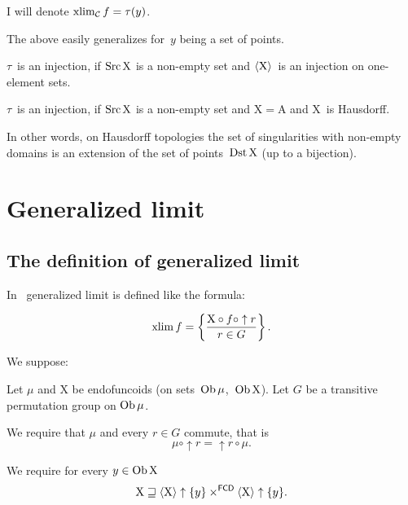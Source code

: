 I will denote $\operatorname{xlim}_{\mathcal{C}} f = \tau(y)$.

\begin{rem}
The above easily generalizes for~$y$ being a set of points.
\end{rem}

\begin{obvious}
$\tau$~is an injection, if $\operatorname{Src}\mathrm{X}$ is a non-empty set and
$\left\langle \mathrm{X}\right\rangle$~is an injection on one-element sets.
\end{obvious}

\begin{cor}
$\tau$~is an injection, if $\operatorname{Src}\mathrm{X}$ is a non-empty set and
$\mathrm{X}=\mathrm{A}$ and $\mathrm{X}$~is Hausdorff.
\end{cor}

In other words, on Hausdorff topologies the set of singularities
with non-empty domains is an extension of the set of points~$\operatorname{Dst}\mathrm{X}$ (up to a bijection).

\chapter{Generalized limit}

\section{The definition of generalized limit}

In~\cite{volume-1-edition1} generalized limit is defined like the formula:

\begin{equation}\label{xlim1}
\operatorname{xlim} f = \left\{ \frac{ \mathrm{X}\circ f\circ \uparrow r}{r\in G}\right\}.
\end{equation}

We suppose:

Let $\mu$ and $\mathrm{X}$ be endofuncoids (on sets~$\operatorname{Ob}\mu$,~$\operatorname{Ob}\mathrm{X}$). Let $G$ be a transitive permutation
group on $\operatorname{Ob}\mu$.

We require that $\mu$ and every $r\in G$ commute, that is
\begin{equation}\label{commute}
\mu\circ\uparrow r=\uparrow r\circ\mu.
\end{equation}

We require for every $y\in\operatorname{Ob}\mathrm{X}$ 
\begin{equation}\label{lim-squares}
\mathrm{X}\sqsupseteq\left\langle \mathrm{X}\right\rangle\uparrow\{y\}\times^{\mathsf{FCD}}\left\langle \mathrm{X}\right\rangle\uparrow\{y\}.
\end{equation}

